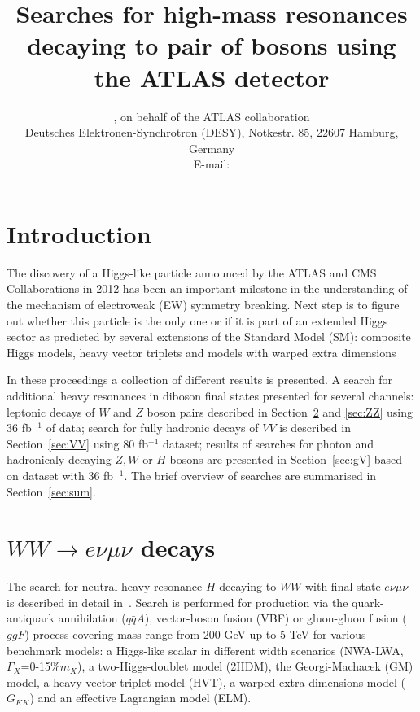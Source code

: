 \documentclass{PoS}
\title{Searches for high-mass resonances decaying to pair of bosons using the ATLAS detector}
\author{\speaker{Kirill Grevtsov}, {on behalf of the ATLAS collaboration}\\%
        Deutsches Elektronen-Synchrotron (DESY), Notkestr. 85, 22607 Hamburg, Germany\\
        E-mail: \email{kirill.grevtsov@cern.ch}}
\begin{document}
\section{Introduction}

The discovery of a Higgs-like particle announced by the ATLAS and CMS Collaborations in 2012 \cite{HIGG-2012-27,CMS-HIG-12-028} has been an important milestone in the understanding of the mechanism of electroweak (EW) symmetry breaking. %
Next step is to figure out whether this particle is the only one or if it is part of an extended Higgs sector as predicted by several extensions of the Standard Model (SM): composite Higgs models, heavy vector triplets and models with warped extra dimensions


In these proceedings a collection of different results is presented.
A search for additional heavy resonances in diboson final states presented for several channels: leptonic decays of $W$ and $Z$ boson pairs described in Section~\ref{sec:WW} and \ref{sec:ZZ} using 36 fb$^{-1}$ of data; search for fully hadronic decays of $VV$ is described in Section~\ref{sec:VV} using 80 fb$^{-1}$ dataset; results of searches for photon and hadronicaly decaying $Z,W$ or $H$ bosons are presented in Section~\ref{sec:gV} based on dataset with 36 fb$^{-1}$. The brief overview of searches are summarised in Section~\ref{sec:sum}.


\section{$WW\rightarrow e\nu \mu \nu$ decays}
\label{sec:WW}
The search for neutral heavy resonance $H$ decaying to $WW$ with final state $e\nu \mu \nu$ is described in detail in~\cite{HIGG-2016-31}. Search is performed for production via the quark-antiquark annihilation ($q\bar{q}A$), vector-boson fusion (VBF) or gluon-gluon fusion ($ggF$) process covering mass range from 200 GeV up to 5 TeV for various benchmark models: a Higgs-like scalar in different width scenarios (NWA-LWA, $\Gamma_X$=0-15\%$m_X$), a two-Higgs-doublet model (2HDM), the Georgi-Machacek (GM) model, a heavy vector triplet model (HVT), a warped extra dimensions model ($G_{KK}$) and an effective Lagrangian model (ELM).
\end{document}
